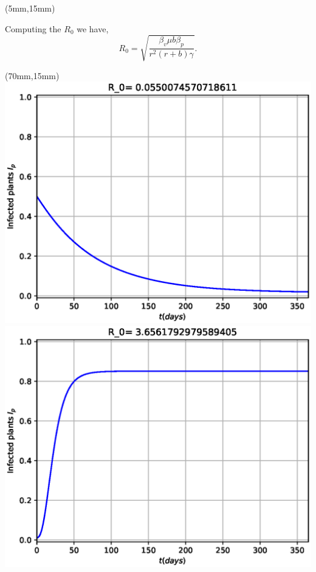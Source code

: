 \documentclass[10pt]{beamer}
\begin{document}
\begin{frame}
	\begin{textblock*}{50mm}(5mm,15mm)
		\begin{greenbox}{}
			Computing the $R_0$ we have,
			\begin{equation*}
				R_0=\sqrt{\frac{\beta_v\mu b\beta_p}{r^2(r+b)\gamma}}.
			\end{equation*}
		\end{greenbox}
		
	\end{textblock*}
	\begin{textblock*}{50mm}(70mm,15mm)
		\includegraphics[width=\linewidth]{Feathergraphics/Tomato_simulation_1.eps}
		\includegraphics[width=\linewidth]{Feathergraphics/Tomato_simulation_2.eps}
	\end{textblock*}	
\end{frame}
%
\end{document}
